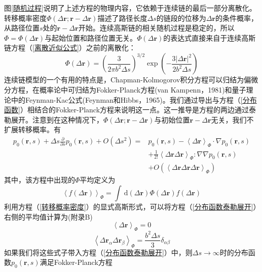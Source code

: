 图\ref{随机过程}说明了上述方程的物理内容，它依赖于连续链的最后一部分离散化。转移概率密度$\Phi(\Delta \mathbf{r};\mathbf{r}-\Delta \mathbf{r})$描述了路径长度$\Delta s$的链段的位移为$\Delta \mathbf{r}$的条件概率，从路径位置$s$处的$\mathbf{r}-\Delta \mathbf{r}$开始。连续高斯链的相关随机过程是稳定的，所以$\Phi =\Phi(\Delta \mathbf{r})$与起始位置和路径位置无关。$\Phi(\Delta \mathbf{r})$的表达式直接来自于连续高斯链方程（\ref{离散近似公式}）之前的离散化：
\begin{equation}
\Phi(\Delta \mathbf{r})=\left( \frac{3}{2\pi b^2 \Delta s} \right)^{3/2}\exp \left(- \frac{3\left| \Delta \mathbf{r} \right|^2}{2b^2 \Delta s} \right) \label{转移概率密度}
\end{equation}
连续链模型的一个有用的特点是，Chapman-Kolmogorov积分方程可以归结为偏微分方程，在概率论中可归结为Fokker-Planck方程(van Kampenn，1981)和量子理论中的Feynman-Kac公式(Feynman和Hibbs，1965)。我们通过导出与方程（\ref{分布函数}）相结合的Fokker-Planck方程来说明这一点。这一推导是方程的两边通过泰勒展开。注意到在这种情况下，$\Phi(\Delta \mathbf{r};\mathbf{r}-\Delta \mathbf{r})$与初始位置$\mathbf{r}-\Delta \mathbf{r}$无关，我们不扩展转移概率。有
\begin{equation}
\begin{aligned}
p_0(\mathbf{r},s)+\Delta s\frac{\partial}{\partial s}p_0(\mathbf{r},s)+O(\Delta s^2)=&p_0(\mathbf{r},s)-\left \langle \Delta \mathbf{r} \right \rangle _\Phi \cdot \nabla p_0 (\mathbf{r},s)\\ &+\frac{1}{2!}\left \langle \Delta \mathbf{r}  \Delta \mathbf{r} \right \rangle _\Phi:\nabla \nabla p_0(\mathbf{r},s)\\ &+O(\left \langle \Delta \mathbf{r}  \Delta \mathbf{r}  \Delta \mathbf{r} \right \rangle _\Phi) \label{分布函数泰勒展开}
\end{aligned}
\end{equation}
其中，该方程中出现的$\Phi$平均定义为
\begin{equation}
\left \langle f(\Delta \mathbf{r}) \right \rangle _\Phi = \int \, \mathrm{d}(\Delta \mathbf{r})\Phi (\Delta \mathbf{r})f(\Delta \mathbf{r})
\end{equation}
利用方程（\ref{转移概率密度}）的显式高斯形式，可以将方程（\ref{分布函数泰勒展开}）右侧的平均值计算为(附录B)
\begin{equation}
\left \langle \Delta \mathbf{r} \right \rangle _\Phi = 0
\end{equation}
\begin{equation}
\left \langle \Delta \mathbf{r}_\alpha \Delta \mathbf{r}_\beta \right \rangle _\Phi = \frac{b^2 \Delta s}{3}\delta_{\alpha \beta}
\end{equation}
如果我们将这些式子带入方程（\ref{分布函数泰勒展开}）中，则$\Delta s \rightarrow \infty$时的分布函数$p_0(\mathbf{r},s)$满足Fokker-Planck方程

